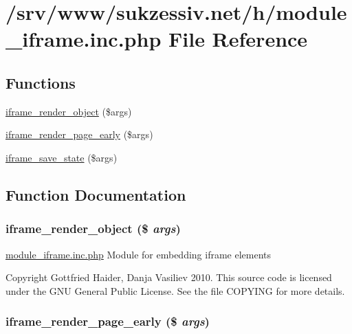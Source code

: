 \hypertarget{module__iframe_8inc_8php}{
\section{/srv/www/sukzessiv.net/h/module\_\-iframe.inc.php File Reference}
\label{module__iframe_8inc_8php}
}
\subsection*{Functions}
\begin{CompactItemize}
\item 
\hyperlink{module__iframe_8inc_8php_40856482f79fb837bc538e8eed66aff4}{iframe\_\-render\_\-object} (\$args)
\item 
\hyperlink{module__iframe_8inc_8php_d4d8fd8256a19beb570193c2886659e5}{iframe\_\-render\_\-page\_\-early} (\$args)
\item 
\hyperlink{module__iframe_8inc_8php_3034fcc475334b511b91932918fcfe57}{iframe\_\-save\_\-state} (\$args)
\end{CompactItemize}


\subsection{Function Documentation}
\hypertarget{module__iframe_8inc_8php_40856482f79fb837bc538e8eed66aff4}{
\subsubsection[{iframe\_\-render\_\-object}]{\setlength{\rightskip}{0pt plus 5cm}iframe\_\-render\_\-object (\$ {\em args})}}
\label{module__iframe_8inc_8php_40856482f79fb837bc538e8eed66aff4}


\hyperlink{module__iframe_8inc_8php}{module\_\-iframe.inc.php} Module for embedding iframe elements

Copyright Gottfried Haider, Danja Vasiliev 2010. This source code is licensed under the GNU General Public License. See the file COPYING for more details. \hypertarget{module__iframe_8inc_8php_d4d8fd8256a19beb570193c2886659e5}{
\subsubsection[{iframe\_\-render\_\-page\_\-early}]{\setlength{\rightskip}{0pt plus 5cm}iframe\_\-render\_\-page\_\-early (\$ {\em args})}}
\label{module__iframe_8inc_8php_d4d8fd8256a19beb570193c2886659e5}


